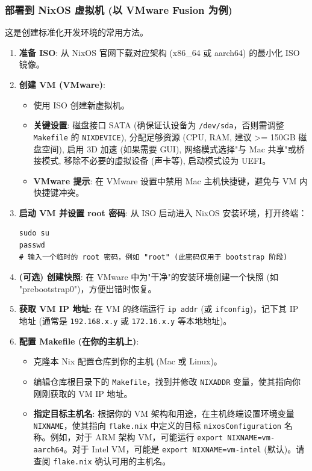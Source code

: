 \documentclass[11pt, a4paper]{article} %
\begin{document}
\subsubsection{部署到 NixOS 虚拟机 (以 VMware Fusion 为例)}
这是创建标准化开发环境的常用方法。
\begin{enumerate}[label=\textbf{\arabic*.}, wide, labelwidth=!, labelindent=0pt]
    \item \textbf{准备 ISO}: 从 NixOS 官网下载对应架构 (x86\_64 或 aarch64) 的最小化 ISO 镜像。
    \item \textbf{创建 VM (VMware)}:
        \begin{itemize}
            \item 使用 ISO 创建新虚拟机。
            \item \textbf{关键设置}: 磁盘接口 SATA (确保证认设备为 \texttt{/dev/sda}，否则需调整 \texttt{Makefile} 的 \texttt{NIXDEVICE}), 分配足够资源 (CPU, RAM, 建议 >= 150GB 磁盘空间), 启用 3D 加速 (如果需要 GUI), 网络模式选择"与 Mac 共享"或桥接模式, 移除不必要的虚拟设备 (声卡等), 启动模式设为 UEFI。
            \item \textbf{VMware 提示}: 在 VMware 设置中禁用 Mac 主机快捷键，避免与 VM 内快捷键冲突。
        \end{itemize}
    \item \textbf{启动 VM 并设置 root 密码}: 从 ISO 启动进入 NixOS 安装环境，打开终端：
        \begin{lstlisting}
sudo su
passwd
# 输入一个临时的 root 密码，例如 "root" (此密码仅用于 bootstrap 阶段)
        \end{lstlisting}
    \item \textbf{(可选) 创建快照}: 在 VMware 中为"干净"的安装环境创建一个快照 (如 "prebootstrap0")，方便出错时恢复。
    \item \textbf{获取 VM IP 地址}: 在 VM 的终端运行 \texttt{ip addr} (或 \texttt{ifconfig})，记下其 IP 地址 (通常是 \texttt{192.168.x.y} 或 \texttt{172.16.x.y} 等本地地址)。
    \item \textbf{配置 Makefile (在你的主机上)}:
        \begin{itemize}
            \item 克隆本 Nix 配置仓库到你的主机 (Mac 或 Linux)。
            \item 编辑仓库根目录下的 \texttt{Makefile}，找到并修改 \texttt{NIXADDR} 变量，使其指向你刚刚获取的 VM IP 地址。
            \item \textbf{指定目标主机名}: 根据你的 VM 架构和用途，在主机终端设置环境变量 \texttt{NIXNAME}，使其指向 \texttt{flake.nix} 中定义的目标 \texttt{nixosConfiguration} 名称。例如，对于 ARM 架构 VM，可能运行 \texttt{export NIXNAME=vm-aarch64}。对于 Intel VM，可能是 \texttt{export NIXNAME=vm-intel} (默认)。请查阅 \texttt{flake.nix} 确认可用的主机名。

\end{itemize}
\end{enumerate}
\end{document}
